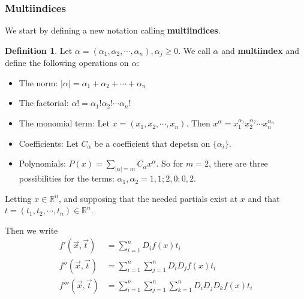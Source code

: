 \documentclass[12pt]{article}
\newcommand{\R}{\mathbb{R}}
\theoremstyle{definition}
\newtheorem{definition}{Definition}[section]
\theoremstyle{remark}
\begin{document}
\subsubsection{Multiindices}
We start by defining a new notation calling \textbf{multiindices}.
\begin{definition}
    Let $\alpha=(\alpha_1,\alpha_2,\cdots,\alpha_n), \alpha_j\geq 0$.
    We call $\alpha$ and \textbf{multiindex} and define the following operations on $\alpha$:
    \begin{itemize}
       \item The norm: $|\alpha|=\alpha_1+\alpha_2+\cdots+\alpha_n$ 
       \item The factorial: $\alpha! = \alpha_1!\alpha_2!\cdots\alpha_n!$
       \item The monomial term: Let $x=(x_1,x_2,\cdots,x_n)$. Then $x^\alpha=x_1^{\alpha_1}x_2^{\alpha_2}\cdots x_n^{\alpha_n}$
       \item Coefficients: Let $C_\alpha$ be a coefficient that depetsn on $\{\alpha_i\}$.
       \item Polynomials: $P(x)=\sum_{|\alpha|=m}C_\alpha x^\alpha$. So for $m=2$, there are three possibilities for the terms: $\alpha_1,\alpha_2=1,1;2,0;0,2$.
    \end{itemize}
\end{definition}
Letting $x\in\R^n$, and supposing that the needed partials exist at $x$ and that $t=(t_1,t_2,\cdots,t_n)\in\R^n$.

Then we write 
\begin{align*}
   f'(\vec{x},\vec{t})&=\sum_{i=1}^nD_if(x)t_i\\ 
   f''(\vec{x},\vec{t})&=\sum_{i=1}^n\sum_{j=1}^nD_iD_jf(x)t_i\\ 
   f'''(\vec{x},\vec{t})&=\sum_{i=1}^n\sum_{j=1}^n\sum_{k=1}^nD_iD_jD_kf(x)t_i\\ 
\end{align*}
\end{document}
